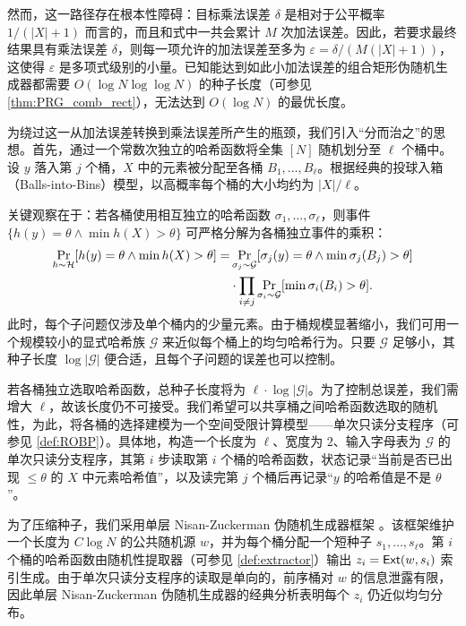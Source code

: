 然而，这一路径存在根本性障碍：目标乘法误差 $\delta$ 是相对于公平概率 $1/(|X| + 1)$ 而言的，而且和式中一共会累计 $M$ 次加法误差。因此，若要求最终结果具有乘法误差 $\delta$，则每一项允许的加法误差至多为 $\varepsilon = \delta / (M (|X| + 1))$，这使得 $\varepsilon$ 是多项式级别的小量。已知能达到如此小加法误差的组合矩形伪随机生成器都需要 $O(\log N \log \log N)$ 的种子长度（可参见 \cref{thm:PRG_comb_rect}），无法达到 $O(\log N)$ 的最优长度。

为绕过这一从加法误差转换到乘法误差所产生的瓶颈，我们引入“分而治之”的思想。首先，通过一个常数次独立的哈希函数将全集 $[N]$ 随机划分至 $\ell$ 个桶中。设 $y$ 落入第 $j$ 个桶，$X$ 中的元素被分配至各桶 $B_1, \ldots, B_\ell$。根据经典的投球入箱（Balls-into-Bins）模型，以高概率每个桶的大小均约为 $|X|/\ell$。

关键观察在于：若各桶使用相互独立的哈希函数 $\sigma_1, \ldots, \sigma_\ell$，则事件 $\{h(y) = \theta \wedge \min h(X) > \theta\}$ 可严格分解为各桶独立事件的乘积：
\begin{align}
    \Pr_{h \sim \mathcal{H}}[h(y) = \theta \wedge \min h(X) > \theta] = & \Pr_{\sigma_j \sim \mathcal{G}}[\sigma_j(y) = \theta \wedge \min \sigma_j(B_j) > \theta] \notag \\
     & \cdot \prod_{i \ne j} \Pr_{\sigma_i \sim \mathcal{G}}[\min \sigma_i(B_i) > \theta]. \label{eq:bucket_decomp}
\end{align}
此时，每个子问题仅涉及单个桶内的少量元素。由于桶规模显著缩小，我们可用一个规模较小的显式哈希族 $\mathcal{G}$ 来近似每个桶上的均匀哈希行为。只要 $\mathcal{G}$ 足够小，其种子长度 $\log |\mathcal{G}|$ 便合适，且每个子问题的误差也可以控制。

若各桶独立选取哈希函数，总种子长度将为 $\ell \cdot \log |\mathcal{G}|$。为了控制总误差，我们需增大 $\ell$，故该长度仍不可接受。我们希望可以共享桶之间哈希函数选取的随机性，为此，将各桶的选择建模为一个空间受限计算模型——单次只读分支程序（可参见 \cref{def:ROBP}）。具体地，构造一个长度为 $\ell$、宽度为 $2$、输入字母表为 $\mathcal{G}$ 的单次只读分支程序，其第 $i$ 步读取第 $i$ 个桶的哈希函数，状态记录“当前是否已出现 $\le \theta$ 的 $X$ 中元素哈希值”，以及读完第 $j$ 个桶后再记录“$y$ 的哈希值是不是 $\theta$”。

为了压缩种子，我们采用单层 Nisan-Zuckerman 伪随机生成器框架 \cite{NZ96_Nisan_Zuckerman_PRG}。该框架维护一个长度为 $C \log N$ 的公共随机源 $w$，并为每个桶分配一个短种子 $s_1, \ldots, s_\ell$。第 $i$ 个桶的哈希函数由随机性提取器（可参见 \cref{def:extractor}）输出 $z_i = \mathsf{Ext}(w, s_i)$ 索引生成。由于单次只读分支程序的读取是单向的，前序桶对 $w$ 的信息泄露有限，因此单层 Nisan-Zuckerman 伪随机生成器的经典分析表明每个 $z_i$ 仍近似均匀分布。

